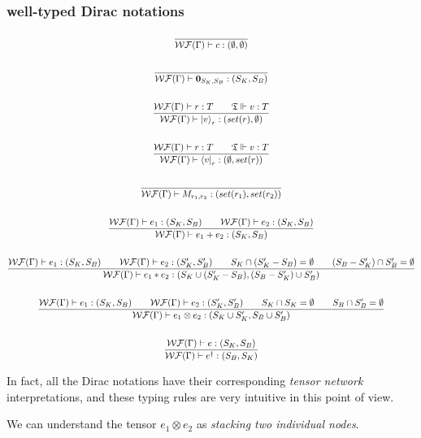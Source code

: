 \documentclass{article}
\begin{document}
\subsubsection*{well-typed Dirac notations}
\begin{gather*}
  \frac{}{\mathcal{WF}(\Gamma)\vdash c : (\emptyset, \emptyset)} \\
  \ \\
  \frac{}{\mathcal{WF}(\Gamma)\vdash \textbf{0}_{S_K, S_B} : (S_K, S_B)}\\
  \ \\
  \frac{\mathcal{WF}(\Gamma)\vdash r : T \qquad \mathfrak{T} \Vdash v : T}{\mathcal{WF}(\Gamma)\vdash \ket{v}_r : (set(r), \emptyset)}\\
  \ \\
  \frac{\mathcal{WF}(\Gamma)\vdash r : T \qquad \mathfrak{T} \Vdash v : T}{\mathcal{WF}(\Gamma)\vdash \bra{v}_r : (\emptyset, set(r))}\\
  \ \\
  \frac{}{\mathcal{WF}(\Gamma)\vdash M_{r_1, r_2} : (set(r_1), set(r_2))}\\
  \ \\
  \frac{\mathcal{WF}(\Gamma)\vdash e_1 : (S_K, S_B)\qquad \mathcal{WF}(\Gamma)\vdash e_2 : (S_K, S_B)}{\mathcal{WF}(\Gamma)\vdash e_1 + e_2 : (S_K, S_B)}\\
  \ \\
  \frac{\mathcal{WF}(\Gamma)\vdash e_1 : (S_K, S_B)\qquad \mathcal{WF}(\Gamma)\vdash e_2 : (S_K', S_B')\qquad S_K \cap (S_K'-S_B) = \emptyset\qquad (S_B-S_K')\cap S_B' = \emptyset}{\mathcal{WF}(\Gamma)\vdash e_1 * e_2 : (S_K \cup (S_K' - S_B), (S_B-S_K') \cup S_B')}\\
  \ \\
  \frac{\mathcal{WF}(\Gamma)\vdash e_1 : (S_K, S_B)\qquad \mathcal{WF}(\Gamma)\vdash e_2 : (S_K', S_B')\qquad S_K \cap S_K= \emptyset\qquad S_B\cap S_B' = \emptyset}{\mathcal{WF}(\Gamma)\vdash e_1 \otimes e_2 : (S_K \cup S_K', S_B \cup S_B')}\\
  \ \\
  \frac{\mathcal{WF}(\Gamma)\vdash e : (S_K, S_B)}{\mathcal{WF}(\Gamma)\vdash e^\dagger : (S_B, S_K)}
\end{gather*}

In fact, all the Dirac notations have their corresponding \textit{tensor network} interpretations, and these typing rules are very intuitive in this point of view.

We can understand the tensor $e_1 \otimes e_2$ as \textit{stacking two individual nodes}.
\end{document}
